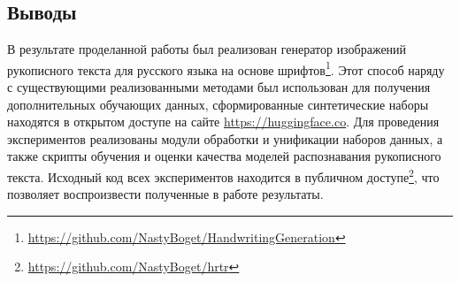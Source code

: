 \subsection{Выводы}
\label{subsec:prac_conclusions}

В результате проделанной работы был реализован генератор изображений рукописного текста для русского языка на основе шрифтов\footnote{\url{https://github.com/NastyBoget/HandwritingGeneration}}.
Этот способ наряду с существующими реализованными методами был использован для получения дополнительных обучающих данных,
сформированные синтетические наборы находятся в открытом доступе на сайте \url{https://huggingface.co}.
Для проведения экспериментов реализованы модули обработки и унификации наборов данных, а также скрипты обучения и
оценки качества моделей распознавания рукописного текста.
Исходный код всех экспериментов находится в публичном доступе\footnote{\url{https://github.com/NastyBoget/hrtr}},
что позволяет воспроизвести полученные в работе результаты.